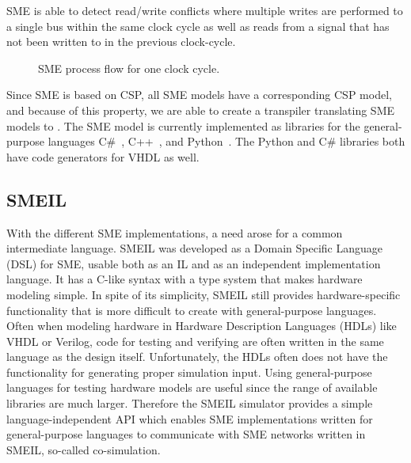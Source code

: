 SME is able to detect read/write conflicts where multiple writes are performed to a single bus within the same clock cycle as well as reads from a signal that has not been written to in the previous clock-cycle.
\\
\begin{figure}[!ht]
  \centering
  \caption{SME process flow for one clock cycle.}
  \label{fig:sme_process_flow}
\end{figure}
Since SME is based on CSP, all SME models have a
corresponding CSP model, and because of this property, we are able to create a transpiler translating SME models to \cspm{}.
The SME model is currently implemented as libraries for the general-purpose languages C\#~\cite{Skovhede}, C++~\cite{asheim2015}, and Python~\cite{asheim2016vhdl}. The Python and C\# libraries both have code generators for VHDL as well.

\subsection{SMEIL}
\label{SMEIL-section}
With the different SME implementations, a need arose for a common intermediate language. SMEIL was developed as a Domain Specific Language (DSL) for SME, usable both as an IL and as an independent implementation language. It has a C-like syntax with a type system that makes hardware modeling simple. In spite of its simplicity, SMEIL still provides hardware-specific functionality that is more difficult to create with general-purpose languages.
Often when modeling hardware in Hardware Description Languages (HDLs) like VHDL or Verilog, code for testing and verifying are often written in the same language as the design itself. Unfortunately, the HDLs often does not have the functionality for generating proper simulation input. Using general-purpose languages for testing hardware models are useful since the range of available libraries are much larger.
Therefore the SMEIL simulator provides a simple language-independent API which enables SME implementations written for general-purpose languages to communicate with SME networks written in SMEIL, so-called co-simulation.


